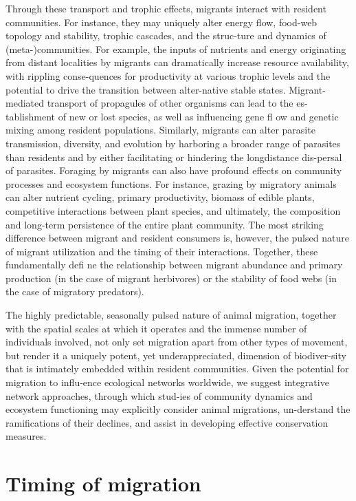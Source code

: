\documentclass[
]{book}
\begin{document}
Through these transport and trophic effects, migrants interact with resident communities. For instance, they may uniquely alter energy flow, food-web topology and stability, trophic cascades, and the struc-ture and dynamics of (meta-)communities. For example, the inputs of nutrients and energy originating from distant localities by migrants can dramatically increase resource availability, with rippling conse-quences for productivity at various trophic levels and the potential to drive the transition between alter-native stable states. Migrant-mediated transport of propagules of other organisms can lead to the es-tablishment of new or lost species, as well as influencing gene fl ow and genetic mixing among resident populations. Similarly, migrants can alter parasite transmission, diversity, and evolution by harboring a broader range of parasites than residents and by either facilitating or hindering the longdistance dis-persal of parasites. Foraging by migrants can also have profound effects on community processes and ecosystem functions. For instance, grazing by migratory animals can alter nutrient cycling, primary productivity, biomass of edible plants, competitive interactions between plant species, and ultimately, the composition and long-term persistence of the entire plant community. The most striking difference between migrant and resident consumers is, however, the pulsed nature of migrant utilization and the timing of their interactions. Together, these fundamentally defi ne the relationship between migrant abundance and primary production (in the case of migrant herbivores) or the stability of food webs (in the case of migratory predators).

The highly predictable, seasonally pulsed nature of animal migration, together with the spatial scales at which it operates and the immense number of individuals involved, not only set migration apart from other types of movement, but render it a uniquely potent, yet underappreciated, dimension of biodiver-sity that is intimately embedded within resident communities. Given the potential for migration to influ-ence ecological networks worldwide, we suggest integrative network approaches, through which stud-ies of community dynamics and ecosystem functioning may explicitly consider animal migrations, un-derstand the ramifications of their declines, and assist in developing effective conservation measures.

\hypertarget{timing-of-migration}{%
\chapter{Timing of migration}\label{timing-of-migration}}
\end{document}
